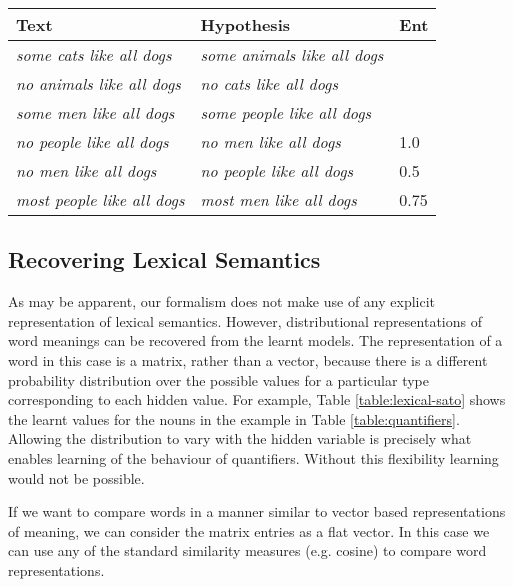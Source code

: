\documentclass{svmult}
\begin{document}
\begin{table*}
\centering
\begin{tabular}{|l|l|l|}
\hline
Text & Hypothesis & Ent\\
\hline
\emph{some cats like all dogs} & \emph{some animals like all dogs} & \\
\emph{no animals like all dogs} & \emph{no cats like all dogs} & \\
\emph{some men like all dogs} & \emph{some people like all dogs} & \\
\hline
\emph{no people like all dogs} & \emph{no men like all dogs} & 1.0\\
\emph{no men like all dogs} & \emph{no people like all dogs} & 0.5\\
\emph{most people like all dogs} & \emph{most men like all dogs} & 0.75\\
\hline
\end{tabular}
\caption{Learning how quantifiers reverse the entailment direction,
  with training data at the top, and test data below, with the degree
  of entailment determined by our system.}
\label{table:quantifiers}
\end{table*}

\begin{table}
\centering
{}
\caption{Learnt probabilities for the nouns in the example
  in Table \ref{table:quantifiers}}
\label{table:lexical-sato}
\end{table}

\subsection{Recovering Lexical Semantics}
\label{sec:recovering}

As may be apparent, our formalism does not make use of any explicit representation of
lexical semantics. However, distributional representations of word
meanings can be recovered from the learnt models. The representation
of a word in this case is a matrix, rather than a vector, because there is a different 
probability distribution over the possible values for a particular
type corresponding to each hidden value. For example, Table \ref{table:lexical-sato} shows the learnt
values for the nouns in the example in Table
\ref{table:quantifiers}. Allowing the distribution to vary with the
hidden variable is precisely what enables learning of the behaviour of
quantifiers. Without this flexibility learning would not be possible.

If we want to compare words in a manner similar to vector based
representations of meaning, we can consider the matrix entries as a
flat vector. In this case we can use any of the standard similarity measures (e.g. 
cosine) to compare word representations.
\end{document}
